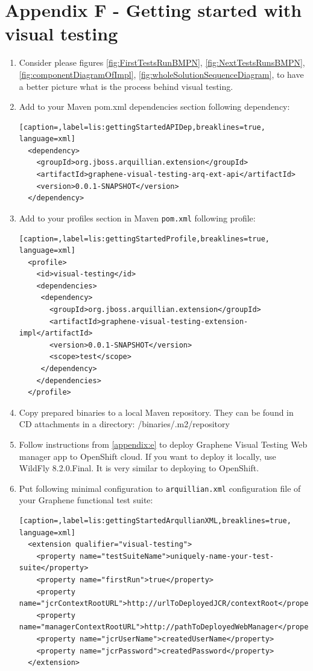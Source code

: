 \documentclass[11pt,oneside,final]{fithesis2}
\begin{document}
\chapter{Appendix F - Getting started with visual testing}
\label{appendix:f}
\begin{enumerate}
 
 \item Consider please figures \ref{fig:FirstTestsRunBMPN}, \ref{fig:NextTestsRunsBMPN}, \ref{fig:componentDiagramOfImpl}, 
 \ref{fig:wholeSolutionSequenceDiagram}, to have a better picture what is the process behind visual testing.

 \item Add to your Maven pom.xml dependencies section following dependency:
 \begin{lstlisting}[caption=,label=lis:gettingStartedAPIDep,breaklines=true, language=xml]
  <dependency>
    <groupId>org.jboss.arquillian.extension</groupId>
    <artifactId>graphene-visual-testing-arq-ext-api</artifactId>
    <version>0.0.1-SNAPSHOT</version>
  </dependency>
  \end{lstlisting}

 \item Add to your profiles section in Maven \texttt{pom.xml} following profile:
 \begin{lstlisting}[caption=,label=lis:gettingStartedProfile,breaklines=true, language=xml]
  <profile>
    <id>visual-testing</id>
    <dependencies>
     <dependency>
       <groupId>org.jboss.arquillian.extension</groupId>
       <artifactId>graphene-visual-testing-extension-impl</artifactId>
       <version>0.0.1-SNAPSHOT</version>
       <scope>test</scope>
     </dependency>
    </dependencies>
  </profile>
  \end{lstlisting}

  \item Copy prepared binaries to a local Maven repository. They can be found in CD attachments in a directory: /binaries/.m2/repository
 
 \item Follow instructions from \ref{appendix:e} to deploy Graphene Visual Testing Web manager app to OpenShift cloud. If you want to deploy it
 locally, use WildFly 8.2.0.Final. It is very similar to deploying to OpenShift.\newpage
 
 \item Put following minimal configuration to \texttt{arquillian.xml} configuration file of your Graphene functional test suite:
 \begin{lstlisting}[caption=,label=lis:gettingStartedArqullianXML,breaklines=true, language=xml]
  <extension qualifier="visual-testing">
    <property name="testSuiteName">uniquely-name-your-test-suite</property>
    <property name="firstRun">true</property>
    <property name="jcrContextRootURL">http://urlToDeployedJCR/contextRoot</property>
    <property name="managerContextRootURL">http://pathToDeployedWebManager</property>
    <property name="jcrUserName">createdUserName</property>
    <property name="jcrPassword">createdPassword</property>
  </extension>
 \end{lstlisting}
  

\end{enumerate}
\end{document}
